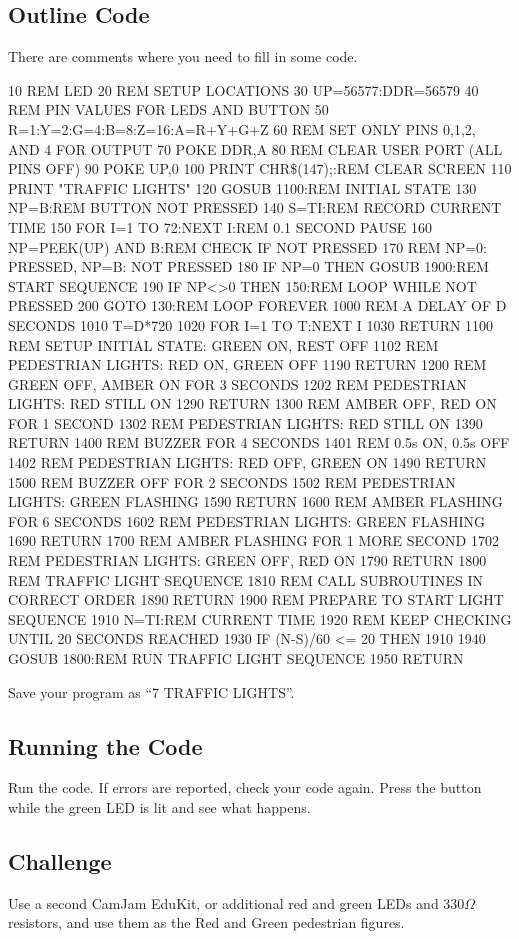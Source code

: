 \subsection*{Outline Code}

There are comments where you need to fill in some code.
\begin{basic}
10 REM LED
20 REM SETUP LOCATIONS
30 UP=56577:DDR=56579
40 REM PIN VALUES FOR LEDS AND BUTTON
50 R=1:Y=2:G=4:B=8:Z=16:A=R+Y+G+Z
60 REM SET ONLY PINS 0,1,2, AND 4 FOR OUTPUT
70 POKE DDR,A
80 REM CLEAR USER PORT (ALL PINS OFF)
90 POKE UP,0
100 PRINT CHR\$(147);:REM CLEAR SCREEN
110 PRINT "TRAFFIC LIGHTS"
120 GOSUB 1100:REM INITIAL STATE
130 NP=B:REM BUTTON NOT PRESSED
140 S=TI:REM RECORD CURRENT TIME
150 FOR I=1 TO 72:NEXT I:REM 0.1 SECOND PAUSE
160 NP=PEEK(UP) AND B:REM CHECK IF NOT PRESSED
170 REM NP=0: PRESSED, NP=B: NOT PRESSED
180 IF NP=0 THEN GOSUB 1900:REM START SEQUENCE
190 IF NP<>0 THEN 150:REM LOOP WHILE NOT PRESSED
200 GOTO 130:REM LOOP FOREVER
1000 REM A DELAY OF D SECONDS
1010 T=D*720
1020 FOR I=1 TO T:NEXT I
1030 RETURN
1100 REM SETUP INITIAL STATE: GREEN ON, REST OFF
1102 REM PEDESTRIAN LIGHTS: RED ON, GREEN OFF
1190 RETURN
1200 REM GREEN OFF, AMBER ON FOR 3 SECONDS
1202 REM PEDESTRIAN LIGHTS: RED STILL ON
1290 RETURN
1300 REM AMBER OFF, RED ON FOR 1 SECOND
1302 REM PEDESTRIAN LIGHTS: RED STILL ON
1390 RETURN
1400 REM BUZZER FOR 4 SECONDS
1401 REM 0.5s ON, 0.5s OFF
1402 REM PEDESTRIAN LIGHTS: RED OFF, GREEN ON
1490 RETURN
1500 REM BUZZER OFF FOR 2 SECONDS
1502 REM PEDESTRIAN LIGHTS: GREEN FLASHING
1590 RETURN
1600 REM AMBER FLASHING FOR 6 SECONDS
1602 REM PEDESTRIAN LIGHTS: GREEN FLASHING
1690 RETURN
1700 REM AMBER FLASHING FOR 1 MORE SECOND
1702 REM PEDESTRIAN LIGHTS: GREEN OFF, RED ON
1790 RETURN
1800 REM TRAFFIC LIGHT SEQUENCE
1810 REM CALL SUBROUTINES IN CORRECT ORDER
1890 RETURN
1900 REM PREPARE TO START LIGHT SEQUENCE
1910 N=TI:REM CURRENT TIME
1920 REM KEEP CHECKING UNTIL 20 SECONDS REACHED
1930 IF (N-S)/60 <= 20 THEN 1910
1940 GOSUB 1800:REM RUN TRAFFIC LIGHT SEQUENCE
1950 RETURN
\end{basic}

Save your program as ``7 TRAFFIC LIGHTS''.

\subsection*{Running the Code}

Run the code.  If errors are reported, check your code again.  Press the button while the green LED is lit and see what happens.

\subsection*{Challenge}

Use a second CamJam EduKit, or additional red and green LEDs and 330$\Omega$ resistors, and use them as the Red and Green pedestrian figures.
